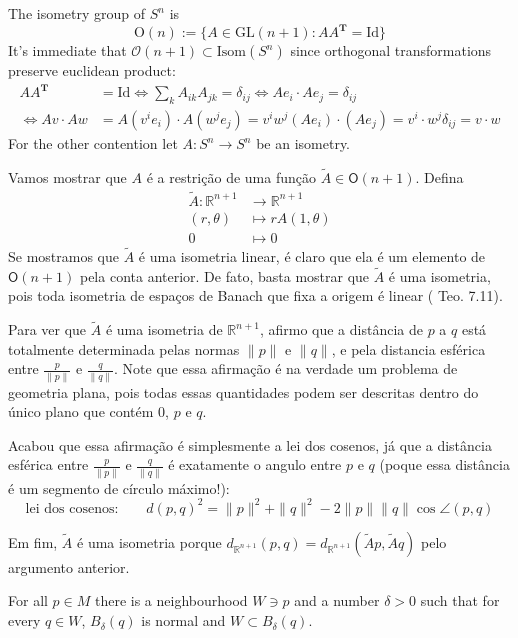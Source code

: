 \begin{example}
\label{example-isometry-group-of-Sn}
The isometry group of $S^n$ is
$$
\text{O}(n):=\{A\in\text{GL}(n+1):AA^{\mathbf{T}}=\text{Id}\}
$$
It's immediate that $\mathcal{O}(n+1)\subset \text{Isom}(S^n)$ since orthogonal
transformations preserve euclidean product:
\begin{align*}
A A^{\mathbf{T}}&=\text{Id}\iff \sum_k A_{ik}A_{jk}=\delta_{ij}
\iff Ae_i\cdot Ae_j=\delta_{ij}\\ 
\iff Av\cdot Aw&= A\left( v^ie_i\right) \cdot A\left( w^je_j\right) 
=v^iw^j (Ae_i)\cdot (Ae_j)
=v^i\cdot w^j\delta_{ij}=v\cdot w
\end{align*}
For the other contention let $A:S^n \to S^n$ be an isometry.

Vamos mostrar que $A$ é a restrição de uma função $\tilde{A} \in
\mathsf{O}(n+1)$. Defina
\begin{align*}
\tilde{A}: \mathbb{R}^{n+1} &\longrightarrow \mathbb{R}^{n+1} \\
(r,\theta) &\longmapsto rA(1,\theta)\\
0&\longmapsto 0
\end{align*}
Se mostramos que $\tilde{A}$ é uma isometria linear, é claro que ela é um
elemento de $\mathsf{O}(n+1)$ pela conta anterior. De fato, basta mostrar que
$\tilde{A}$ é uma isometria, pois toda isometria de espaços de Banach que fixa
a origem é linear (\cite{braga} Teo. 7.11).

Para ver que $\tilde{A}$ é uma isometria de $\mathbb{R}^{n+1}$,
afirmo que a distância de $p$ a $q$ está totalmente determinada
pelas normas  $\|p\|$ e $\|q\|$, e pela distancia esférica entre
$\frac{p}{\|p\|}$ e $\frac{q}{\|q\|}$. Note que essa afirmação é na verdade
um problema de geometria plana, pois todas essas quantidades podem ser descritas
dentro do único plano que contém $0$, $p$ e $q$.

Acabou que essa afirmação é simplesmente a lei dos cosenos, já que a distância
esférica entre $\frac{p}{\|p\|}$ e $\frac{q}{\|q\|}$ é exatamente o angulo
entre $p$ e $q$ (poque essa distância é um segmento de círculo máximo!):
\[\text{lei dos cosenos:} \qquad d(p,q)^2=\|p\|^2+\|q\|^2-2\|p\|\|q\| \cos
\angle(p,q) \]

Em fim, $\tilde{A}$ é uma isometria porque
$d_{\mathbb{R}^{n+1}}(p,q)=d_{\mathbb{R}^{n+1}}(\tilde{A}p,\tilde{A}q)$ pelo
argumento anterior.
\end{example}

\begin{proposition}
\label{proposition-totally-normal-neighbourhoods}
For all $p \in M$ there is a neighbourhood $W \ni p$ and a number $\delta>0$ 
 such that for every $q \in W$, $B_\delta(q)$ is normal and
 $W \subset B_\delta(q)$. 
\end{proposition}

